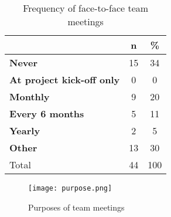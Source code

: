 \begin{table}
\centering
\caption{Frequency of face-to-face team meetings} \label{table:f2f}
\begin{tabular}{lcc}
\hline
 & \textbf{n} & \textbf{\%} \\ \hline
\textbf{Never}&15&34\\
\textbf{At project kick-off only}&0&0\\
\textbf{Monthly}&9&20\\
\textbf{Every 6 months}&5&11\\
\textbf{Yearly}&2&5\\ 
\textbf{Other}&13&30\\ 
Total&44&100\\
\hline
\end{tabular}
\end{table}


\begin{figure}[hbt!]
\centering
\texttt{[image: purpose.png]}
\caption{Purposes of team meetings}\label{fig:purpose}
\end{figure}